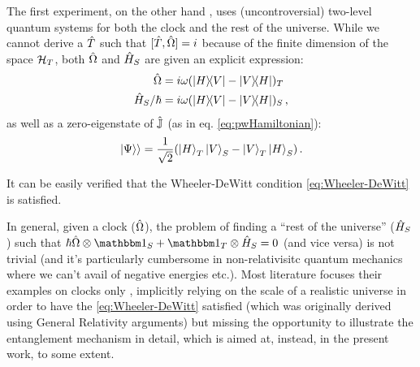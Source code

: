 The first experiment, on the other hand \parencite{Moreva:illustration,Moreva:synthetic},
uses (uncontroversial)
two-level quantum systems for both the clock and the rest of the universe.
While we cannot derive a $\hat{T}$ such that $[\hat{T}, \hat{\Omega}] = i$
because of the finite dimension of the space $\mathcal{H}_T$, both $\hat{\Omega}$
and $\hat{H}_S$ are given an explicit expression:
\begin{align}\label{eq:MorevaOmegaT}
  \hat{\Omega}            &= i\omega(\ketbra{H}{V}- \ketbra{V}{H})_T \\
  \hat{H}_S/{\hbar}       &= i\omega(\ketbra{H}{V}- \ketbra{V}{H})_S
  \,\text{,}
\end{align}
as well as a zero-eigenstate of $\hat{\mathbb{J}}$ (as in eq. \ref{eq:pwHamiltonian}):
\begin{equation}\label{eq:moreva:overall_state}
  \left.\left| \Psi \right\rangle\right\rangle = \frac{1}{\sqrt{2}}\qty(\ket{H}_T\ket{V}_S-\ket{V}_T\ket{H}_S)
  \,\text{.}
\end{equation}

It can be easily verified that the Wheeler-DeWitt condition
\eqref{eq:Wheeler-DeWitt} is satisfied.

In general, given a clock ($\hat{\Omega}$), the problem of finding a
``rest of the universe'' ($\hat{H}_S$) such that
$\hbar\op{\Omega}\ox\idop_S + \idop_T\ox\op{H}_S = 0$
(and vice versa)
is not trivial
(and it's particularly cumbersome in non-relativisitc
quantum mechanics where we can't avail of negative energies etc.).
Most literature focuses their examples on clocks only
\parencite{Prvanovic,RealisticClocks,HarmonicClocks},
implicitly relying on the scale of a realistic universe
in order to have the \eqref{eq:Wheeler-DeWitt} satisfied
(which was originally derived using General Relativity arguments)
but missing the opportunity to illustrate the entanglement mechanism in detail,
which is aimed at, instead, in the present work, to some extent.
